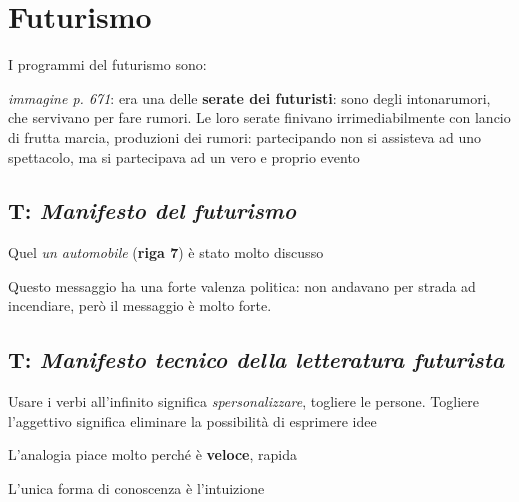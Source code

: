 \section{Futurismo}

I programmi del futurismo sono:


\emph{immagine p. 671}: era una delle \textbf{serate dei futuristi}: sono degli intonarumori, che servivano per fare rumori. 
Le loro serate finivano irrimediabilmente con lancio di frutta marcia, produzioni dei rumori: partecipando non si assisteva ad uno spettacolo, ma si partecipava ad un vero e proprio evento

\subsection{T: \textit{Manifesto del futurismo}}

Quel \textit{un automobile} (\textbf{riga 7}) è stato molto discusso

Questo messaggio ha una forte valenza politica: non andavano per strada ad incendiare, però il messaggio è molto forte.


\subsection{T: \textit{Manifesto tecnico della letteratura futurista}}

Usare i verbi all’infinito significa \textit{spersonalizzare}, togliere le persone. Togliere l’aggettivo significa eliminare la possibilità di esprimere idee

L’analogia piace molto perché è \textbf{veloce}, rapida

L’unica forma di conoscenza è l’intuizione

